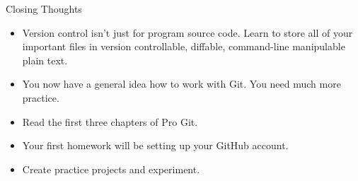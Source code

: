\documentclass{beamer}
\begin{document}
\begin{frame}[fragile]{Closing Thoughts}

\begin{itemize}
\item Version control isn't just for program source code. Learn to store all of your important files in version controllable, diffable, command-line manipulable plain text.
\item You now have a general idea how to work with Git. You need much more practice.
\item Read the first three chapters of Pro Git.
\item Your first homework will be setting up your GitHub account.
\item Create practice projects and experiment.
\end{itemize}


\end{frame}








\end{document}
